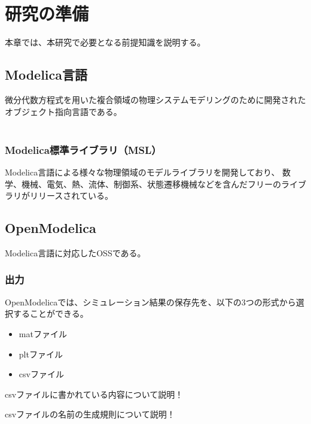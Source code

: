 \chapter{研究の準備}\label{cha:Preparation}
本章では、本研究で必要となる前提知識を説明する。
\section{Modelica言語}\label{modelica}
微分代数方程式を用いた複合領域の物理システムモデリングのために開発されたオブジェクト指向言語である。\\
　\subsection{Modelica標準ライブラリ（MSL）}\label{MSL}
        Modelica言語による様々な物理領域のモデルライブラリを開発しており、
        数学、機械、電気、熱、流体、制御系、状態遷移機械などを含んだフリーのライブラリがリリースされている。

\section{OpenModelica}\label{OM}
Modelica言語に対応したOSSである\cite{fritzson2006openmodelica}。

\subsection{出力}\label{output}
OpenModelicaでは、シミュレーション結果の保存先を、以下の3つの形式から選択することができる。
\begin{itemize}
    \item matファイル
    \item pltファイル
    \item csvファイル
\end{itemize}
csvファイルに書かれている内容について説明！

csvファイルの名前の生成規則について説明！

